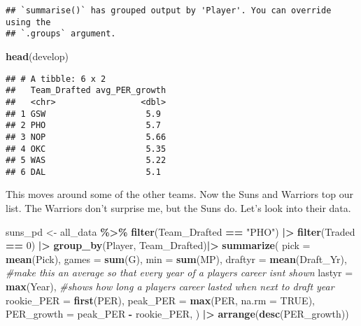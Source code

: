 \documentclass[
]{article}
\newenvironment{Shaded}{\begin{snugshade}}{\end{snugshade}}
\newcommand{\AttributeTok}[1]{\textcolor[rgb]{0.13,0.29,0.53}{#1}}
\newcommand{\CommentTok}[1]{\textcolor[rgb]{0.56,0.35,0.01}{\textit{#1}}}
\newcommand{\ConstantTok}[1]{\textcolor[rgb]{0.56,0.35,0.01}{#1}}
\newcommand{\DecValTok}[1]{\textcolor[rgb]{0.00,0.00,0.81}{#1}}
\newcommand{\FunctionTok}[1]{\textcolor[rgb]{0.13,0.29,0.53}{\textbf{#1}}}
\newcommand{\NormalTok}[1]{#1}
\newcommand{\OtherTok}[1]{\textcolor[rgb]{0.56,0.35,0.01}{#1}}
\newcommand{\SpecialCharTok}[1]{\textcolor[rgb]{0.81,0.36,0.00}{\textbf{#1}}}
\newcommand{\StringTok}[1]{\textcolor[rgb]{0.31,0.60,0.02}{#1}}
\begin{document}
\begin{verbatim}
## `summarise()` has grouped output by 'Player'. You can override using the
## `.groups` argument.
\end{verbatim}

\begin{Shaded}
\begin{Highlighting}[]
\FunctionTok{head}\NormalTok{(develop)}
\end{Highlighting}
\end{Shaded}

\begin{verbatim}
## # A tibble: 6 x 2
##   Team_Drafted avg_PER_growth
##   <chr>                 <dbl>
## 1 GSW                    5.9 
## 2 PHO                    5.7 
## 3 NOP                    5.66
## 4 OKC                    5.35
## 5 WAS                    5.22
## 6 DAL                    5.1
\end{verbatim}

This moves around some of the other teams. Now the Suns and Warriors top
our list. The Warriors don't surprise me, but the Suns do. Let's look
into their data.

\begin{Shaded}
\begin{Highlighting}[]
\NormalTok{suns\_pd }\OtherTok{\textless{}{-}}\NormalTok{ all\_data }\SpecialCharTok{\%\textgreater{}\%} \FunctionTok{filter}\NormalTok{(Team\_Drafted }\SpecialCharTok{==} \StringTok{"PHO"}\NormalTok{) }\SpecialCharTok{|\textgreater{}} \FunctionTok{filter}\NormalTok{(Traded }\SpecialCharTok{==} \DecValTok{0}\NormalTok{) }\SpecialCharTok{|\textgreater{}} \FunctionTok{group\_by}\NormalTok{(Player, Team\_Drafted)}\SpecialCharTok{|\textgreater{}}
  \FunctionTok{summarize}\NormalTok{(}
    \AttributeTok{pick =} \FunctionTok{mean}\NormalTok{(Pick),}
    \AttributeTok{games =} \FunctionTok{sum}\NormalTok{(G),}
    \AttributeTok{min =} \FunctionTok{sum}\NormalTok{(MP),}
    \AttributeTok{draftyr =} \FunctionTok{mean}\NormalTok{(Draft\_Yr), }\CommentTok{\#make this an average so that every year of a player\textquotesingle{}s career isn\textquotesingle{}t shown}
    \AttributeTok{lastyr =} \FunctionTok{max}\NormalTok{(Year), }\CommentTok{\#shows how long a player\textquotesingle{}s career lasted when next to draft year}
    \AttributeTok{rookie\_PER =} \FunctionTok{first}\NormalTok{(PER),}
    \AttributeTok{peak\_PER =} \FunctionTok{max}\NormalTok{(PER, }\AttributeTok{na.rm =} \ConstantTok{TRUE}\NormalTok{),}
    \AttributeTok{PER\_growth =}\NormalTok{ peak\_PER }\SpecialCharTok{{-}}\NormalTok{ rookie\_PER,}
\NormalTok{    ) }\SpecialCharTok{|\textgreater{}}
  \FunctionTok{arrange}\NormalTok{(}\FunctionTok{desc}\NormalTok{(PER\_growth))}
\end{Highlighting}
\end{Shaded}
\end{document}
